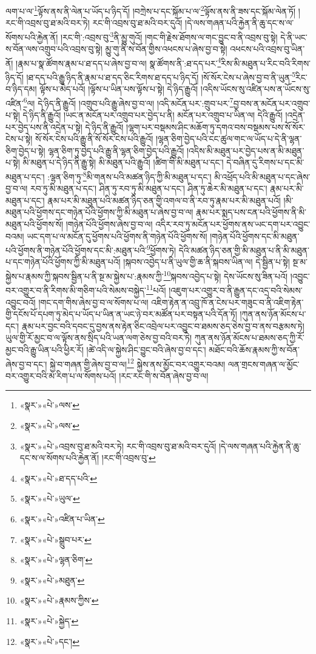 ལག་པ་ལ་\footnote{«སྣར་»«པེ་»ལས་}ལྟོས་ནས་ནི་ལེན་པ་ཡོད་པ་ཉིད་དོ། །བཀྲེས་པ་དང་སྐོམ་པ་ལ་\footnote{«སྣར་»«པེ་»ལས་}ལྟོས་ནས་ནི་ཟས་དང་སྐོམ་ལེན་ཏོ། །རང་གི་འབྲས་བུ་ཐ་མའི་བར་ཏེ། རང་གི་འབྲས་བུ་ཐ་མའི་བར་དུའོ། །དེ་ལས་གཞན་པའི་རྐྱེན་ནི་ཆུ་དང་ས་ལ་སོགས་པའི་རྐྱེན་ནོ། །རང་གི་:འབྲས་བུ་\footnote{«སྣར་»«པེ་»འབྲས་བུ་ཐ་མའི་བར་ཏེ། རང་གི་འབྲས་བུ་ཐ་མའི་བར་དུའོ། །དེ་ལས་གཞན་པའི་རྐྱེན་ནི་ཆུ་དང་ས་ལ་སོགས་པའི་རྐྱེན་ནོ། །རང་གི་འབྲས་བུ་}ནི་མྱུ་གུའོ། །གང་གི་རྗེས་ཐོགས་ལ་གང་བྱུང་བ་ནི་འབྲས་བུ་སྟེ། དེ་ནི་ཡང་ས་བོན་ལས་འགྲུབ་པའི་འབྲས་བུ་སྟེ། མྱུ་གུ་ནི་ས་བོན་གྱིས་འཕངས་པ་ཞེས་བྱ་བ་སྟེ། འཕངས་པའི་འབྲས་བུ་ཡིན་ནོ། །རྣམ་པ་སྣ་ཚོགས་རྣམ་པ་ཐ་དད་པ་ཞེས་བྱ་བ་ལ། སྣ་ཚོགས་ནི་:ཐ་དད་པར་\footnote{«སྣར་»«པེ་»ཐ་དད་པའི་}རིས་མི་མཐུན་པ་རིང་བའི་རིགས་ཉིད་དོ། །ཐ་དད་པའི་རྒྱུ་ཉིད་ནི་རྣམ་པ་ཐ་དད་ཅིང་རིགས་ཐ་དད་པ་ཉིད་དོ། །སོ་སོར་ངེས་པ་ཞེས་བྱ་བ་ནི་ཡུན་\footnote{«སྣར་»«པེ་»ཡུལ་}རིང་བ་ཉིད་དམ། ལྟོས་པ་མེད་པའོ། །ལྟོས་པ་ཡིན་པས་ལྟོས་པ་སྟེ། དེ་ཉིད་རྒྱུའོ། །འདིས་ཡོངས་སུ་འཛིན་པས་ན་ཡོངས་སུ་འཛིན་\footnote{«སྣར་»«པེ་»འཛིན་པ་ཡིན་}ལ། དེ་ཉིད་ནི་རྒྱུའོ། །འགྲུབ་པའི་རྒྱུ་ཞེས་བྱ་བ་ལ། །འདི་མངོན་པར་:གྲུབ་པར་\footnote{«སྣར་»«པེ་»སྒྲུབ་པར་}བྱ་བས་ན་མངོན་པར་འགྲུབ་པ་སྟེ། དེ་ཉིད་ནི་རྒྱུའོ། །ཡང་ན་མངོན་པར་འགྲུབ་པར་བྱེད་པ་ནི། མངོན་པར་འགྲུབ་པ་ཡིན་ལ། དེའི་རྒྱུའོ། །འདྲེན་པར་བྱེད་པས་ནི་འདྲེན་པ་སྟེ། དེ་ཉིད་ནི་རྒྱུའོ། །ལྷག་པར་བསྡམས་ཤིང་མཆོག་ཏུ་དགའ་བས་བསྡམས་པས་སོ་སོར་ངེས་པ་སྟེ། སོ་སོར་ངེས་པའི་རྒྱུ་ནི་སོ་སོར་ངེས་པའི་རྒྱུའོ། །ལྷན་ཅིག་བྱེད་པའི་ངང་ཚུལ་གང་ལ་ཡོད་པ་དེ་ནི་ལྷན་ཅིག་བྱེད་པ་སྟེ། ལྷན་ཅིག་ཏུ་བྱེད་པའི་རྒྱུ་ནི་ལྷན་ཅིག་བྱེད་པའི་རྒྱུའོ། །འདིས་མི་མཐུན་པར་བྱེད་པས་ན་མི་མཐུན་པ་སྟེ། མི་མཐུན་པ་དེ་ཉིད་ནི་རྒྱུ་སྟེ། མི་མཐུན་པའི་རྒྱུའོ། །ཚིག་གི་མི་མཐུན་པ་དང་། དེ་བཞིན་དུ་རིགས་པ་དང་མི་མཐུན་པ་དང་། :ལྷན་ཅིག་ཏུ་\footnote{«སྣར་»«པེ་»ལྷན་ཅིག་}མི་གནས་པའི་མཚན་ཉིད་ཀྱི་མི་མཐུན་པ་དང་། མི་འཕྲོད་པའི་མི་མཐུན་པ་དང་ཞེས་བྱ་བ་ལ། རབ་ཏུ་མི་མཐུན་པ་དང་། ཤིན་ཏུ་རབ་ཏུ་མི་མཐུན་པ་དང་། ཤིན་ཏུ་ཆེར་མི་མཐུན་པ་དང་། རྣམ་པར་མི་མཐུན་པ་དང་། རྣམ་པར་མི་མཐུན་པའི་མཚན་ཉིད་ཅན་གྱི་འགལ་བ་ནི་རབ་ཏུ་རྣམ་པར་མི་མཐུན་པའོ། །མི་མཐུན་པའི་ཕྱོགས་དང་གཉེན་པོའི་ཕྱོགས་ཀྱི་མི་མཐུན་པ་ཞེས་བྱ་བ་ལ། རྣམ་པར་སྨད་པས་ངན་པའི་ཕྱོགས་ནི་མི་མཐུན་པའི་ཕྱོགས་སོ། །གཉེན་པོའི་ཕྱོགས་ཞེས་བྱ་བ་ལ། འདིར་རབ་ཏུ་མངོན་པར་ཕྱོགས་ནས་ཡང་དག་པར་འབྱུང་བའམ། ཡང་དག་པ་ལ་མངོན་དུ་ཕྱོགས་པའི་ཕྱོགས་ནི་གཉེན་པོའི་ཕྱོགས་སོ། །གཉེན་པོའི་ཕྱོགས་དང་མི་མཐུན་པའི་ཕྱོགས་ནི་གཉེན་པོའི་ཕྱོགས་དང་མི་:མཐུན་པའི་\footnote{«སྣར་»«པེ་»མཐུན་}ཕྱོགས་ཏེ། དེའི་མཚན་ཉིད་ཅན་གྱི་མི་མཐུན་པ་ནི་མི་མཐུན་པ་དང་གཉེན་པོའི་ཕྱོགས་ཀྱི་མི་མཐུན་པའོ། །སྐབས་འབྱེད་པ་ནི་ཡུལ་གྱི་ཆ་ནི་སྐབས་ཡིན་ལ། དེ་སྦྱིན་པ་སྟེ། སྔ་མ་སྐྱེས་པ་རྣམས་ཀྱི་སྐབས་སྦྱིན་པ་ནི་སྔ་མ་སྐྱེས་པ་:རྣམས་ཀྱི་\footnote{«སྣར་»«པེ་»རྣམས་ཀྱིས་}སྐབས་འབྱེད་པ་སྟེ། དེས་ཡོངས་སུ་ཟིན་པའོ། །འབྱུང་བར་འགྱུར་བ་ནི་རིགས་མི་གཅིག་པའི་སེམས་བསྐྱེད་\footnote{«སྣར་»«པེ་»སྐྱེད་}པའོ། །འཇུག་པར་འགྱུར་བ་ནི་རྒྱུན་དང་འདྲ་བའི་སེམས་འབྱུང་བའོ། །གང་དག་གིས་ཞེས་བྱ་བ་ལ་སོགས་པ་ལ། འཇིག་རྟེན་ན་འབྲུ་ཁོ་ན་ངེས་པར་གཟུང་བ་ནི་འཇིག་རྟེན་གྱི་དངོས་པོ་དཔག་ཏུ་མེད་པ་ཡོད་པ་ཡིན་ན་ཡང་ཉེ་བར་མཚོན་པར་བསྟན་པའི་དོན་ཏོ། །ཀུན་ནས་ཉོན་མོངས་པ་དང་། རྣམ་པར་བྱང་བའི་དབང་དུ་བྱས་ནས་རྟེན་ཅིང་འབྲེལ་པར་འབྱུང་བ་ཐམས་ཅད་ཅེས་བྱ་བ་ནས་བརྩམས་ཏེ། ཡུལ་གྱི་རོ་མྱང་བ་ལ་ལྟོས་ནས་སྲིད་པའི་ཡན་ལག་ཅེས་བྱ་བའི་བར་ཏེ། ཀུན་ནས་ཉོན་མོངས་པ་ཐམས་ཅད་ཀྱི་རོ་མྱང་བའི་རྒྱུ་ཡིན་པའི་ཕྱིར་རོ། །ཚེ་འདི་ལ་སྐྱེས་ཤིང་བྱུང་བའི་ཞེས་བྱ་བ་དང་། མཐོང་བའི་ཆོས་རྣམས་ཀྱི་ས་བོན་ཞེས་བྱ་བ་དང་། སྐྱེ་བ་གཞན་གྱི་ཞེས་བྱ་བ་ལ།\footnote{«སྣར་»«པེ་»དང་།} སྐྱེས་ནས་མྱོང་བར་འགྱུར་བའམ། ལན་གྲངས་གཞན་ལ་མྱོང་བར་འགྱུར་བའི་མ་རིག་པ་ལ་སོགས་པའོ། །རང་རང་གི་ས་བོན་ཞེས་བྱ་བ་ལ། 
